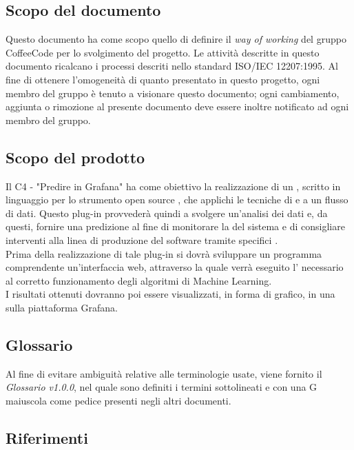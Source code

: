 \documentclass[../norme-di-progetto.tex]{subfiles}
\begin{document}
\subsection{Scopo del documento}
Questo documento ha come scopo quello di definire il \emph{way of working} del gruppo CoffeeCode per lo svolgimento del progetto.
Le attività descritte in questo documento ricalcano i processi descriti nello standard ISO/IEC 12207:1995. Al fine di ottenere l'omogeneità di quanto presentato in questo progetto, ogni membro del gruppo è tenuto a visionare questo documento; ogni cambiamento, aggiunta o rimozione al presente documento deve essere inoltre notificato ad ogni membro del gruppo.

\subsection{Scopo del prodotto}
Il  C4 - "Predire in Grafana" ha come obiettivo la realizzazione di un , scritto in linguaggio  per lo strumento open source , che applichi le tecniche di   e  a un flusso di dati. Questo plug-in provvederà quindi a svolgere un'analisi dei dati e, da questi, fornire una predizione al fine di monitorare la  del sistema e di consigliare interventi alla linea di produzione del software tramite specifici . \\
Prima della realizzazione di tale plug-in si dovrà sviluppare un programma comprendente un'interfaccia web, attraverso la quale verrà eseguito l' necessario al corretto funzionamento degli algoritmi di Machine Learning. \\
I risultati ottenuti dovranno poi essere visualizzati, in forma di grafico, in una  sulla piattaforma Grafana.

\subsection{Glossario}
Al fine di evitare ambiguità relative alle terminologie usate, viene fornito il \textit{Glossario v1.0.0}, nel quale sono definiti i termini sottolineati e con una G maiuscola come pedice presenti negli altri documenti.

\subsection{Riferimenti}
\end{document}
